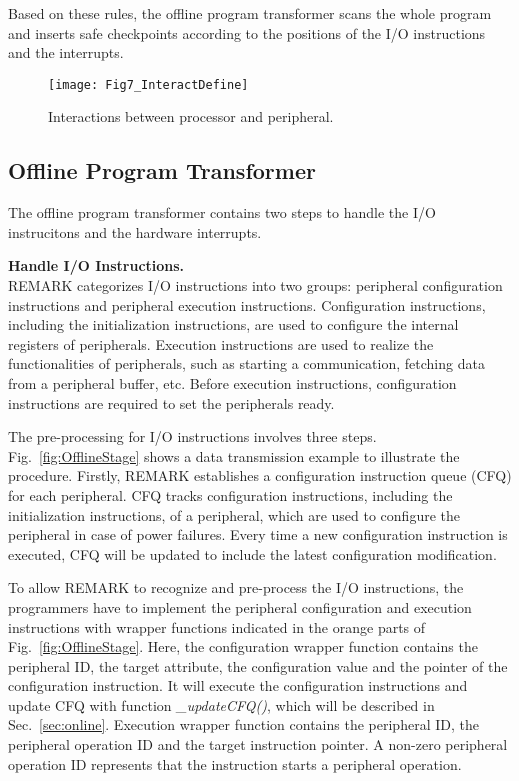 Based on these rules, the offline program transformer scans the whole program and inserts safe checkpoints according to the positions of the I/O instructions and the interrupts.

%   
\begin{figure}[t]
    \centering
    \texttt{[image: Fig7\_InteractDefine]}
    \vspace{-15pt}
    \caption{Interactions between processor and peripheral.}
    \vspace{-5pt}
    \label{fig:InteractDefine}
\end{figure}


\subsection{Offline Program Transformer} \label{sec:offlineTransformer}
\vspace{-5pt}
The offline program transformer contains two steps to handle the I/O instrucitons and the hardware interrupts.

%
\vspace{5pt}
\noindent\textbf{Handle I/O Instructions.} \\
REMARK categorizes I/O instructions into two groups: peripheral configuration instructions and peripheral execution instructions. 
Configuration instructions, including the initialization instructions, are used to configure the internal registers of peripherals.
Execution instructions are used to realize the functionalities of peripherals, such as starting a communication, fetching data from a peripheral buffer, etc. 
Before execution instructions, configuration instructions are required to set the peripherals ready.

%
The pre-processing for I/O instructions involves three steps. 
Fig.~\ref{fig:OfflineStage} shows a data transmission example to illustrate the procedure.
Firstly, REMARK establishes a configuration instruction queue (CFQ) for each peripheral. 
CFQ tracks configuration instructions, including the initialization instructions, of a peripheral, which are used to configure the peripheral in case of power failures.
Every time a new configuration instruction is executed, CFQ will be updated to include the latest configuration modification.

%
To allow REMARK to recognize and pre-process the I/O instructions, the programmers have to implement the peripheral configuration and execution instructions with wrapper functions indicated in the orange parts of Fig.~\ref{fig:OfflineStage}. 
Here, the configuration wrapper function contains the peripheral ID, the target attribute, the configuration value and the pointer of the configuration instruction.
It will execute the configuration instructions and update CFQ with function \emph{\_updateCFQ()}, which will be described in Sec.~\ref{sec:online}.
Execution wrapper function contains the peripheral ID, the peripheral operation ID and the target instruction pointer.
A non-zero peripheral operation ID represents that the instruction starts a peripheral operation.

